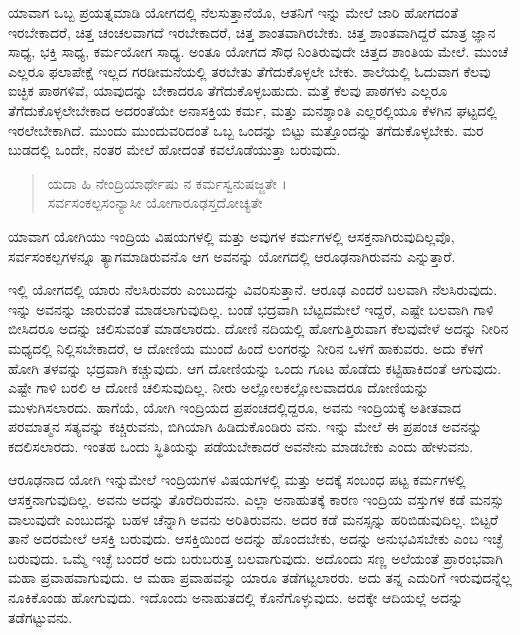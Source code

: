 ಯಾವಾಗ ಒಬ್ಬ ಪ್ರಯತ್ನಮಾಡಿ ಯೋಗದಲ್ಲಿ ನೆಲಸುತ್ತಾನೆಯೊ, ಆತನಿಗೆ ಇನ್ನು ಮೇಲೆ ಜಾರಿ ಹೋಗದಂತೆ ಇರಬೇಕಾದರೆ, ಚಿತ್ತ ಚಂಚಲವಾಗದೆ ಇರಬೇಕಾದರೆ, ಚಿತ್ತ ಶಾಂತವಾಗಿರಬೇಕು. ಚಿತ್ತ ಶಾಂತವಾಗಿದ್ದರೆ ಮಾತ್ರ ಜ್ಞಾನ ಸಾಧ್ಯ, ಭಕ್ತಿ ಸಾಧ್ಯ, ಕರ್ಮಯೋಗ ಸಾಧ್ಯ. ಅಂತೂ ಯೋಗದ ಸೌಧ ನಿಂತಿರುವುದೇ ಚಿತ್ತದ ಶಾಂತಿಯ ಮೇಲೆ. ಮುಂಚೆ ಎಲ್ಲರೂ ಫಲಾಪೇಕ್ಷೆ ಇಲ್ಲದ ಗರಡೀಮನೆಯಲ್ಲಿ ತರಬೇತು ತೆಗೆದುಕೊಳ್ಳಲೇ ಬೇಕು. ಶಾಲೆಯಲ್ಲಿ ಓದುವಾಗ ಕೆಲವು ಐಚ್ಛಿಕ ಪಾಠಗಳಿವೆ, ಯಾವುದನ್ನು ಬೇಕಾದರೂ ತೆಗೆದುಕೊಳ್ಳಬಹುದು. ಮತ್ತೆ ಕೆಲವು ಪಾಠಗಳು ಎಲ್ಲರೂ ತೆಗೆದುಕೊಳ್ಳಲೇಬೇಕಾದ ಅದರಂತೆಯೇ ಅನಾಸಕ್ತಿಯ ಕರ್ಮ, ಮತ್ತು ಮನಶ್ಶಾಂತಿ ಎಲ್ಲರಲ್ಲಿಯೂ ಕೆಳಗಿನ ಘಟ್ಟದಲ್ಲಿ ಇರಲೇಬೇಕಾಗಿದೆ. ಮುಂದು ಮುಂದುವರಿದಂತೆ ಒಬ್ಬ ಒಂದನ್ನು ಬಿಟ್ಟು ಮತ್ತೊಂದನ್ನು ತಗೆದುಕೊಳ್ಳಬೇಕು. ಮರ ಬುಡದಲ್ಲಿ ಒಂದೇ, ನಂತರ ಮೇಲೆ ಹೋದಂತೆ ಕವಲೊಡೆಯುತ್ತಾ ಬರುವುದು.

\begin{verse}
ಯದಾ ಹಿ ನೇಂದ್ರಿಯಾರ್ಥೇಷು ನ ಕರ್ಮಸ್ವನುಷಜ್ಜತೇ ।\\ಸರ್ವಸಂಕಲ್ಪಸಂನ್ಯಾಸೀ ಯೋಗಾರೂಢಸ್ತದೋಚ್ಯತೇ 
\end{verse}

{\small ಯಾವಾಗ ಯೋಗಿಯು ಇಂದ್ರಿಯ ವಿಷಯಗಳಲ್ಲಿ ಮತ್ತು ಅವುಗಳ ಕರ್ಮಗಳಲ್ಲಿ ಆಸಕ್ತನಾಗಿರುವುದಿಲ್ಲವೊ, ಸರ್ವಸಂಕಲ್ಪಗಳನ್ನೂ ತ್ಯಾಗಮಾಡಿರುವನೊ ಆಗ ಅವನನ್ನು ಯೋಗದಲ್ಲಿ ಆರೂಢನಾಗಿರುವನು ಎನ್ನುತ್ತಾರೆ.}

ಇಲ್ಲಿ ಯೋಗದಲ್ಲಿ ಯಾರು ನೆಲಸಿರುವರು ಎಂಬುದನ್ನು ವಿವರಿಸುತ್ತಾನೆ. ಆರೂಢ ಎಂದರೆ ಬಲವಾಗಿ ನೆಲಸಿರುವುದು. ಇನ್ನು ಅವನನ್ನು ಜಾರುವಂತೆ ಮಾಡಲಾಗುವುದಿಲ್ಲ. ಬಂಡೆ ಭದ್ರವಾಗಿ ಬೆಟ್ಟದಮೇಲೆ ಇದ್ದರೆ, ಎಷ್ಟೇ ಬಲವಾಗಿ ಗಾಳಿ ಬೀಸಿದರೂ ಅದನ್ನು ಚಲಿಸುವಂತೆ ಮಾಡಲಾರದು. ದೋಣಿ ನದಿಯಲ್ಲಿ ಹೋಗುತ್ತಿರುವಾಗ ಕೆಲವುವೇಳೆ ಅದನ್ನು ನೀರಿನ ಮಧ್ಯದಲ್ಲಿ ನಿಲ್ಲಿಸಬೇಕಾದರೆ, ಆ ದೋಣಿಯ ಮುಂದೆ ಹಿಂದೆ ಲಂಗರನ್ನು ನೀರಿನ ಒಳಗೆ ಹಾಕುವರು. ಅದು ಕೆಳಗೆ ಹೋಗಿ ತಳವನ್ನು ಭದ್ರವಾಗಿ ಕಚ್ಚುವುದು. ಆಗ ದೋಣಿಯನ್ನು ಒಂದು ಗೂಟ ಹೊಡೆದು ಕಟ್ಟಿಹಾಕಿದಂತೆ ಆಗುವುದು. ಎಷ್ಟೇ ಗಾಳಿ ಬರಲಿ ಆ ದೋಣಿ ಚಲಿಸುವುದಿಲ್ಲ. ನೀರು ಅಲ್ಲೋಲಕಲ್ಲೋಲವಾದರೂ ದೋಣಿಯನ್ನು ಮುಳುಗಿಸಲಾರದು. ಹಾಗೆಯೆ, ಯೋಗಿ ಇಂದ್ರಿಯದ ಪ್ರಪಂಚದಲ್ಲಿದ್ದರೂ, ಅವನು ಇಂದ್ರಿಯಕ್ಕೆ ಅತೀತವಾದ ಪರಮಾತ್ಮನ ಸತ್ಯವನ್ನು ಕಚ್ಚಿರುವನು, ಬಿಗಿಯಾಗಿ ಹಿಡಿದುಕೊಂಡಿರು ವನು. ಇನ್ನು ಮೇಲೆ ಈ ಪ್ರಪಂಚ ಅವನನ್ನು ಕದಲಿಸಲಾರದು. ಇಂತಹ ಒಂದು ಸ್ಥಿತಿಯನ್ನು ಪಡೆಯಬೇಕಾದರೆ ಅವನೇನು ಮಾಡಬೇಕು ಎಂದು ಹೇಳುವನು.

ಆರೂಢನಾದ ಯೋಗಿ ಇನ್ನುಮೇಲೆ ಇಂದ್ರಿಯಗಳ ವಿಷಯಗಳಲ್ಲಿ ಮತ್ತು ಅದಕ್ಕೆ ಸಂಬಂಧ ಪಟ್ಟ ಕರ್ಮಗಳಲ್ಲಿ ಆಸಕ್ತನಾಗುವುದಿಲ್ಲ. ಅವನು ಅದನ್ನು ತೊರೆದಿರುವನು. ಎಲ್ಲಾ ಅನಾಹುತಕ್ಕೆ ಕಾರಣ ಇಂದ್ರಿಯ ವಸ್ತುಗಳ ಕಡೆ ಮನಸ್ಸು ವಾಲುವುದೇ ಎಂಬುದನ್ನು ಬಹಳ ಚೆನ್ನಾಗಿ ಅವನು ಅರಿತಿರುವನು. ಅದರ ಕಡೆ ಮನಸ್ಸನ್ನು ಹರಿಬಿಡುವುದಿಲ್ಲ. ಬಿಟ್ಟರೆ ತಾನೆ ಅದರಮೇಲೆ ಆಸಕ್ತಿ ಬರುವುದು. ಆಸಕ್ತಿಯಿಂದ ಅದನ್ನು ಹೊಂದಬೇಕು, ಅದನ್ನು ಅನುಭವಿಸಬೇಕು ಎಂಬ ಇಚ್ಛೆ ಬರುವುದು. ಒಮ್ಮೆ ಇಚ್ಛೆ ಬಂದರೆ ಅದು ಬರುಬರುತ್ತ ಬಲವಾಗುವುದು. ಅದೊಂದು ಸಣ್ಣ ಅಲೆಯಂತೆ ಪ್ರಾರಂಭವಾಗಿ ಮಹಾ ಪ್ರವಾಹವಾಗುವುದು. ಆ ಮಹಾ ಪ್ರವಾಹವನ್ನು ಯಾರೂ ತಡೆಗಟ್ಟಲಾರರು. ಅದು ತನ್ನ ಎದುರಿಗೆ ಇರುವುದನ್ನೆಲ್ಲ ನೂಕಿಕೊಂಡು ಹೋಗುವುದು. ಇದೊಂದು ಅನಾಹುತದಲ್ಲಿ ಕೊನೆಗೊಳ್ಳುವುದು. ಅದಕ್ಕೇ ಆದಿಯಲ್ಲೆ ಅದನ್ನು ತಡೆಗಟ್ಟುವನು.

